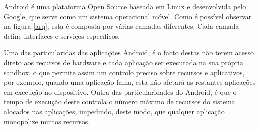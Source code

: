 Android é uma plataforma Open Source baseada em Linux e desenvolvida pelo Google, que serve como um sistema operacional móvel.
Como é possível observar na figura \ref{arq}, esta é composta por várias camadas diferentes. Cada camada define interfaces e serviços específicos.


Uma das particularidas das aplicações Android, é o facto destas não terem acesso direto aos recursos de hardware e cada aplicação ser executada na sua própria sandbox, o que permite assim um controlo preciso sobre recursos e aplicativos, por exemplo, quando uma aplicação falha, esta não afetará as restantes aplicações em execução no dispositivo. Outra das particularidades do Android, é que o tempo de execução deste controla o número máximo de recursos do sistema alocados nas aplicações, impedindo, deste modo, que qualquer aplicação monopolize muitos recursos.



